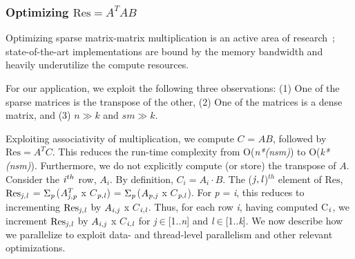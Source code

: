 \vspace*{0.05in} 
\subsubsection{Optimizing $\mathrm{Res}=A^TAB$}
    Optimizing sparse matrix-matrix  multiplication is an
    active area of research~\cite{ballard13,patwary15}; 
    state-of-the-art implementations
    are bound by the memory bandwidth and heavily
    underutilize the compute resources. 

    For our application, we exploit the following three observations:
    (1) One of the sparse matrices is the transpose of the other,   
    (2) One of the matrices is a dense matrix,   and    %
    (3) $n \gg k$ and $sm \gg k$.

    Exploiting associativity of multiplication, we compute $C$ = $AB$, 
    followed by $\mathrm{Res} = A^TC$. This reduces the run-time complexity from
    O({\it{n*(nsm)}}) to O({\it{k*(nsm)}}). Furthermore, we do not
    explicitly compute (or store) the transpose of $A$.  Consider the
    ${\it{i}}^{th}$ row, $A_i$. 
    By definition,  $C_i = A_i \cdot B$.
    The (${\it{j}},{\it{l}}$)$^{th}$ element of $\mathrm{Res}$,
    $\mathrm{Res}_{{\it{j}},{\it{l}}}$ =
    $\Sigma_{\it{p}}$($A^T_{{\it{j}},{\it{p}}}$ x $C$$_{{\it{p}},{\it{l}}}$) = 
    $\Sigma_{\it{p}}$($A_{{\it{p}},{\it{j}}}$ x
    $C$$_{{\it{p}},{\it{l}}}$).
    For {\it{p}} = {\it{i}}, this reduces to incrementing
    $\mathrm{Res}_{{\it{j}},{\it{l}}}$ by $A_{{\it{i}},{\it{j}}}$ x
    $C$$_{{\it{i}},{\it{l}}}$. 
    Thus, for each row {\it{i}}, 
    having computed C$_{\it{i}}$, we
    increment $\mathrm{Res}_{{\it{j}},{\it{l}}}$ 
    by $A_{{\it{i}},{\it{j}}}$ x $C$$_{{\it{i}},{\it{l}}}$
    for {\it{j}}$\in$[1..{\it{n}}] and {\it{l}}$\in$[1..{\it{k}}].
     We now describe how we parallelize  to exploit
     data- and thread-level parallelism and other relevant
     optimizations.





